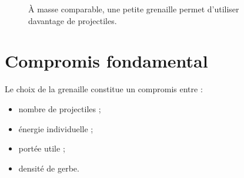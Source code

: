 \begin{figure}[htbp]
\centering


\caption{À masse comparable, une petite grenaille permet d'utiliser davantage de projectiles.}
\label{fig:petite_grande_grenaille}

\end{figure}

\section{Compromis fondamental}

Le choix de la grenaille constitue un compromis entre :

\begin{itemize}
    \item nombre de projectiles ;
    \item énergie individuelle ;
    \item portée utile ;
    \item densité de gerbe.
\end{itemize}

